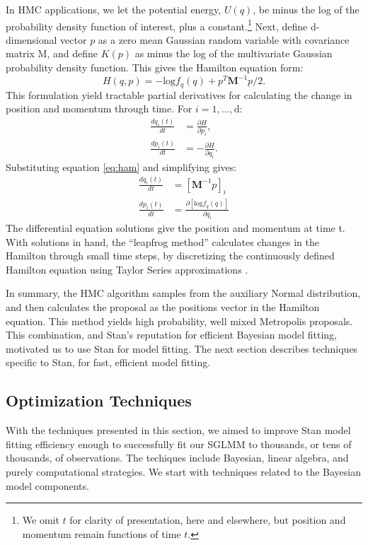 In HMC applications, we let the potential energy, $U(q)$, be minus the log of the probability density function of interest, plus a constant.\footnote{We omit $t$ for clarity of presentation, here and elsewhere, but position and momentum remain functions of time $t$.} Next, define d-dimensional vector $p$ as a zero mean Gaussian random variable with covariance matrix M, and define $K(p)$ as minus the log of the multivariate Gaussian probability density function. This gives the Hamilton equation form:
\begin{equation} \label{eq:ham}
H(q,p) = -\text{log}f_{q}(q) + p^{T}\pmb{M}^{-1}p/2.
\end{equation}
This formulation yield tractable partial derivatives for calculating the change in position and momentum through time. For $i = 1,\dots, \text{d}$:
\begin{align}
\frac{d q_{i}(t)}{dt} &= \frac{\partial H}{\partial p_{i}}, \\
\frac{d p_{i}(t)}{dt} &= -\frac{\partial H}{\partial q_{i}}.
\end{align}
Substituting equation \ref{eq:ham} and simplifying gives:
\begin{align}
\frac{d q_{i}(t)}{dt} &=  [\pmb{M}^{-1}p]_{i} \\
\frac{d p_{i}(t)}{dt} &= \frac {\partial \left[ \text{log}f_{q}(q) \right]}{\partial q_{i}}
\end{align}
The differential equation solutions give the position and momentum at time t. With solutions in hand, the ``leapfrog method'' calculates changes in the Hamilton through small time steps, by discretizing the continuously defined Hamilton equation using Taylor Series approximations \citep{Neal2011}. 

In summary, the HMC algorithm samples from the auxiliary Normal distribution, and then calculates the proposal as the positions vector in the Hamilton equation. This method yields high probability, well mixed Metropolis proposals. This combination, and Stan's reputation for efficient Bayesian model fitting, motivated us to use Stan for model fitting. The next section describes techniques specific to Stan, for fast, efficient model fitting. 

\subsection{Optimization Techniques} %
With the techniques presented in this section, we aimed to improve Stan model fitting efficiency enough to successfully fit our SGLMM to thousands, or tens of thousands, of observations. The techiques include Bayesian, linear algebra, and purely computational strategies. We start with techniques related to the Bayesian model components.

